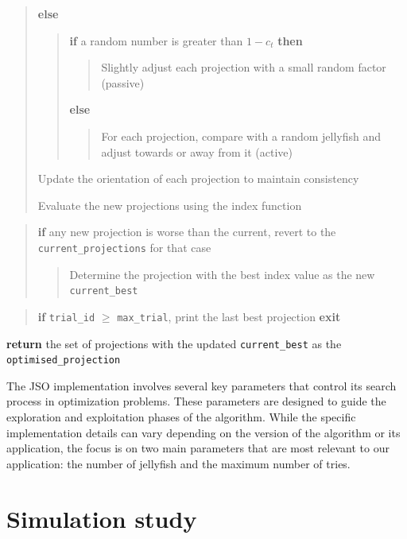 \documentclass[
  12pt,
]{interact}
\theoremstyle{plain}
\begin{document}
\begin{tcolorbox}
\begin{quote}
\textbf{else}

\begin{quote}
\textbf{if} a random number is greater than \(1 - c_t\) \textbf{then}

\begin{quote}
Slightly adjust each projection with a small random factor (passive)
\end{quote}

\textbf{else}

\begin{quote}
For each projection, compare with a random jellyfish and adjust towards
or away from it (active)
\end{quote}
\end{quote}

Update the orientation of each projection to maintain consistency

Evaluate the new projections using the index function
\end{quote}

\begin{quote}
\textbf{if} any new projection is worse than the current, revert to the
\texttt{current\_projections} for that case

\begin{quote}
Determine the projection with the best index value as the new
\texttt{current\_best}
\end{quote}
\end{quote}

\begin{quote}
\textbf{if} \texttt{trial\_id} \(\ge\) \texttt{max\_trial}, print the
last best projection \textbf{exit}
\end{quote}

\textbf{return} the set of projections with the updated
\texttt{current\_best} as the \texttt{optimised\_projection}

\end{tcolorbox}

The JSO implementation involves several key parameters that control its
search process in optimization problems. These parameters are designed
to guide the exploration and exploitation phases of the algorithm. While
the specific implementation details can vary depending on the version of
the algorithm or its application, the focus is on two main parameters
that are most relevant to our application: the number of jellyfish and
the maximum number of tries.

\hypertarget{sec-sim-deets}{%
\section{Simulation study}\label{sec-sim-deets}}
\end{document}
